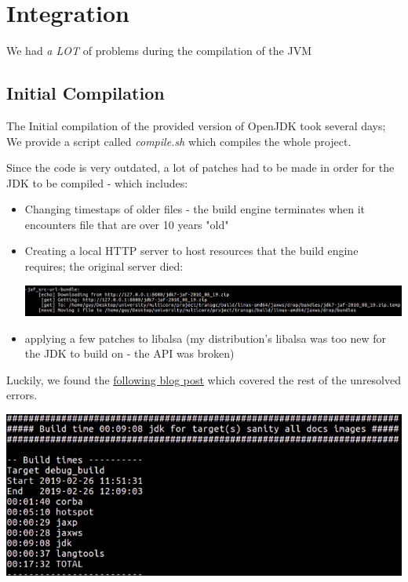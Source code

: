 \documentclass{article}
\begin{document}
 \newpage

 \section{Integration}
 We had \textit{a LOT} of problems during the compilation of the JVM

 \subsection{Initial Compilation}
 The Initial compilation of the provided version of OpenJDK took several days; We provide a script called \textit{compile.sh} which compiles the whole project.
 
 Since the code is very outdated, a lot of patches had to be made in order for the JDK to be compiled - which includes:
 \begin{itemize}
   \item Changing timestaps of older files - the build engine terminates when it encounters file that are over 10 years "old"
   \item Creating a local HTTP server to host resources that the build engine requires; the original server died:

   \includegraphics[width=\textwidth]{local_http_server.png}
   \item applying a few patches to libalsa (my distribution's libalsa was too new for the JDK to build on - the API was broken)
 \end{itemize}

 Luckily, we found the \href{http://www.voidcn.com/article/p-zayqisji-va.html}{following blog post} which covered the rest of the unresolved errors.

 \includegraphics[width=\textwidth]{initial_build.png}
\end{document}
